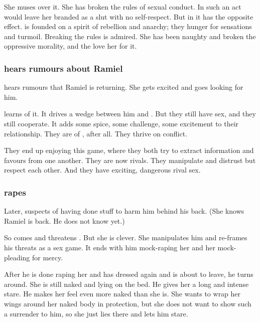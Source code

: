 She muses over it. 
She has broken the rules of sexual conduct. 
In \CiriathSepher{} such an act would leave her branded as a slut with no self-respect. 
But in \Mystraacht{} it has the opposite effect. 
\Mystraacht{} is founded on a spirit of rebellion and anarchy; they hunger for sensations and turmoil. 
Breaking the rules is admired. 
She has been naughty and broken the oppressive \CiriathSepher{} morality, and the \Mystraacht{} love her for it. 





\subsubsection{\Cishiel{} hears rumours about Ramiel}
\Cishiel{} hears rumours that Ramiel is returning. 
She gets excited and goes looking for him. 

\Dasteron{} learns of it. 
It drives a wedge between him and \Cishiel. 
But they still have sex, and they still cooperate. 
It adds some spice, some challenge, some excitement to their relationship. 
They are \resphain{} of \Mystraacht, after all. 
They thrive on conflict. 

They end up enjoying this game, where they both try to extract information and favours from one another. 
They are now rivals. 
They manipulate and distrust but respect each other. 
And they have exciting, dangerous rival sex. 





\subsubsection{\Dasteron{} rapes \Cishiel}
Later, \Dasteron{} suspects \Cishiel{} of having done stuff to harm him behind his back. 
(She knows Ramiel is back. He does not know yet.) 

So \Dasteron{} comes and threatens \Cishiel. 
But she is clever. 
She manipulates him and re-frames his threats as a sex game. 
It ends with him mock-raping her and her mock-pleading for mercy. 

After he is done raping her and has dressed again and is about to leave, he turns around. 
She is still naked and lying on the bed. 
He gives her a long and intense stare. 
He makes her feel even more naked than she is. 
She wants to wrap her wings around her naked body in protection, but she does not want to show such a surrender to him, so she just lies there and lets him stare. 

